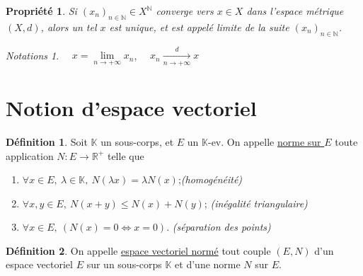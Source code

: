 \documentclass{report}
\newcommand{\reels}{\mathbb{R}}
\newcommand{\naturals}{\mathbb{N}}
\theoremstyle{definition}
\newtheorem{definition}{Définition}
\theoremstyle{plain}
\newtheorem{property}{Propriété}
\theoremstyle{remark}
\newtheorem*{notations}{Notations}
\begin{document}
\begin{leftbar}
    \begin{property}
        Si $(x_n)_{n\in\naturals} \in X^\naturals$ converge vers $x \in X$ 
        dans l'espace métrique $(X, d)$, alors un tel $x$ est unique, et est
        appelé limite de la suite $(x_n)_{n\in\naturals}$.
    \end{property}
\end{leftbar}

\begin{notations}
        $\quad x = \lim\limits_{n \to +\infty} {x_n}$, 
        $\quad x_n \xrightarrow[n \to +\infty]{d} x$\footnotemark
\end{notations}

\newpage

\section{Notion d'espace vectoriel}

\begin{leftbar}
    \begin{definition}
        Soit $\mathbb{K}$ un sous-corps, et $E$ un $\mathbb{K}$-ev. On appelle
        \underline{norme sur $E$} toute application $N : E \to \reels^+$ telle
        que
        \begin{enumerate}
            \item{$\forall x\in E,\ \lambda\in\mathbb{K},\ N(\lambda x) = 
                \lambda N(x)$;\hfill\textit{(homogénéité)}}
            \item{$\forall x, y \in E,\ N(x+y) \le N(x) + N(y)$;\hfill
                \textit{(inégalité triangulaire)}}
            \item{$\forall x\in E,\ (N(x) = 0 \iff x = 0)$.\hfill
                \textit{(séparation des points\footnotemark)}}
        \end{enumerate}
    \end{definition}
\end{leftbar}

\begin{leftbar}
    \begin{definition}
        On appelle \underline{espace vectoriel normé} tout couple $(E, N)$
        d'un espace vectoriel $E$ sur un sous-corps $\mathbb{K}$ et d'une
        norme $N$ sur $E$.
    \end{definition}
\end{leftbar}
\end{document}
